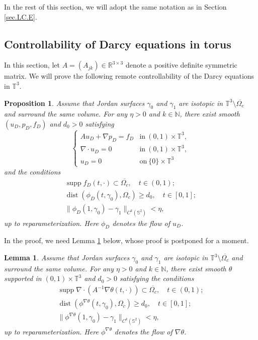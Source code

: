 \documentclass[11pt,a4paper]{article}
\numberwithin{equation}{section}
\newtheorem{lemma}[theorem]{Lemma}
\newtheorem{proposition}[theorem]{Proposition}
{\theorembodyfont{\rmfamily}\newtheorem{remark}[theorem]{Remark}}
{\theorembodyfont{\rmfamily}\newtheorem{remarks}[theorem]{Remarks}}
\newcommand{\N}{\mathbb{N}}
\newcommand{\R}{\mathbb{R}}
\renewcommand{\S}{\mathbb{S}}
\newcommand{\T}{\mathbb{T}}
\newcommand{\opsupp}{\operatorname{supp}}
\newcommand{\opdist}{\operatorname{dist}}
\begin{document}
In the rest of this section, we will adopt the same notation as in Section \ref{sec.LC.E}. 


    \subsection{Controllability of Darcy equations in torus}
    \label{sec.Limit.D}


In this section, let $A = (A_{jk})\in\R^{3\times3}$ denote a positive definite symmetric matrix. We will prove the following remote controllability of the Darcy equations in $\T^3$. 


\begin{proposition}\label{prop.CoD}
Assume that Jordan surfaces $\gamma_0$ and $\gamma_1$ are isotopic in $\T^3\setminus\overline{\Omega_{c}}$ and surround the same volume. For any $\eta>0$ and $k\in\N$, there exist smooth $(u_D, p_D, f_D)$ and $d_0>0$ satisfying 
\begin{equation}\label{eq1.prop.CoD}
    \left\{
    \begin{array}{ll}
    A u_D + \nabla p_D = f_D &\mbox{in}\ (0,1)\times\T^3,\\
    \nabla\cdot u_D = 0 &\mbox{in}\ (0,1)\times\T^3,\\
    u_D=0 &\mbox{on}\ \{0\}\times\T^3
    \end{array}\right.
\end{equation}
and the conditions 
\begin{gather}
    \opsupp f_D(t,\cdot) \subset \overline{\Omega_c}, 
    \quad t\in(0,1); \label{item1.prop.CoD} \\
    \opdist(\phi_D(t,\gamma_0),\Omega_c)\geq d_0, 
    \quad t\in [0,1]; \label{item2.prop.CoD} \\
    \|\phi_D(1,\gamma_0)-\gamma_1\|_{C^k(\S^2)}<\eta, \label{item3.prop.CoD}
\end{gather}
up to reparameterization. Here $\phi_D$ denotes the flow of $u_D$. 
\end{proposition}


In the proof, we need Lemma \ref{lem.PotFlows.D} below, whose proof is postponed for a moment. 


\begin{lemma}\label{lem.PotFlows.D}
Assume that Jordan surfaces $\gamma_0$ and $\gamma_1$ are isotopic in $\T^3\setminus\overline{\Omega_c}$ and surround the same volume. For any $\eta>0$ and $k\in\N$, there exist smooth $\theta$ supported in $(0,1)\times\T^3$ and $d_0>0$ satisfying the conditions 
\begin{gather}
    \opsupp \nabla\cdot(A^{-1}\nabla\theta(t,\cdot)) \subset \overline{\Omega_c}, \quad t\in(0,1); \label{item1.lem.PotFlows.D} \\
    \opdist(\phi^{\nabla\theta}(t,\gamma_0),\Omega_c)\geq d_0, \quad t\in[0,1]; \label{item2.lem.PotFlows.D} \\
    \|\phi^{\nabla\theta}(1,\gamma_0)-\gamma_1\|_{C^k(\S^2)}<\eta, \label{item3.lem.PotFlows.D}
\end{gather}
up to reparameterization. Here $\phi^{\nabla \theta}$ denotes the flow of $\nabla\theta$. 
\end{lemma}
\end{document}

